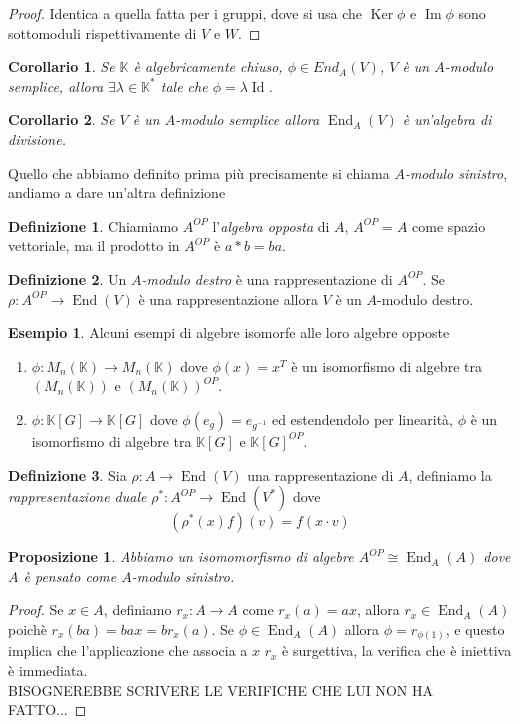 \documentclass[11pt]{article}
\theoremstyle{plain}
\newtheorem{prop}[thm]{Proposizione}
\newtheorem*{cor}{Corollario}
\theoremstyle{definition}
\newtheorem{defn}{Definizione}[section]
\newtheorem{exmp}{Esempio}[section]
\theoremstyle{remark}
\newcommand{\K}{\mathbb{K}}
\DeclareMathOperator{\End}{End}
\DeclareMathOperator{\Ker}{Ker}
\DeclareMathOperator{\Imm}{Im}
\DeclareMathOperator{\Id}{Id}
\begin{document}
	\begin{proof}
		Identica a quella fatta per i gruppi, dove si usa che $\Ker \phi$ e $\Imm \phi$ sono sottomoduli rispettivamente di $V$ e $W$.
	\end{proof}
	\begin{cor}
		Se $\K$ è algebricamente chiuso, $\phi\in End_A(V)$, $V$ è un $A$-modulo semplice, allora $\exists \lambda \in \K^*$ tale che $\phi = \lambda \Id$.
	\end{cor}
	\begin{cor}
		Se $V$ è un $A$-modulo semplice allora $\End_A(V)$ è un'algebra di divisione.
	\end{cor}
	Quello che abbiamo definito prima più precisamente si chiama \textit{$A$-modulo sinistro}, andiamo a dare un'altra definizione
	\begin{defn}
		Chiamiamo $A^{OP}$ l'\textit{algebra opposta} di $A$, $A^{OP}=A$ come spazio vettoriale, ma il prodotto in $A^{OP}$ è $a*b = ba$.
	\end{defn}
	\begin{defn}
		Un \textit{$A$-modulo destro} è una rappresentazione di $A^{OP}$. Se $\rho:A^{OP}\to \End(V)$ è una rappresentazione allora $V$ è un $A$-modulo destro.
	\end{defn}
	\begin{exmp}
		Alcuni esempi di algebre isomorfe alle loro algebre opposte
		\begin{enumerate}
			\item $\phi:M_n(\K) \to M_n(\K)$ dove $\phi(x)= x^T$ è un isomorfismo di algebre tra $\left(M_n(\K) \right)$ e $\left( M_n(\K) \right)^{OP}$.
			\item $\phi:\K[G]\to \K[G]$ dove $\phi(e_g)=e_{g^{-1}}$ ed estendendolo per linearità, $\phi$ è un isomorfismo di algebre tra $\K[G]$ e $\K[G]^{OP}$.
		\end{enumerate}
	\end{exmp}
	\begin{defn} Sia $\rho:A\to \End(V)$ una rappresentazione di $A$, definiamo la \textit{rappresentazione duale} $\rho^*:A^{OP}\to \End(V^*)$ dove
	\[
		(\rho^*(x)f)(v) = f(x\cdot v)
	\]
	\end{defn}
	\begin{prop}
		Abbiamo un isomomorfismo di algebre $A^{OP}\cong \End_A(A)$ dove $A$ è pensato come $A$-modulo sinistro.
	\end{prop}
	\begin{proof}
		Se $x\in A$, definiamo $r_x:A\to A$ come $r_x(a)=ax$, allora $r_x\in \End_A(A)$ poichè $r_x(ba)=bax = br_x(a)$. Se $\phi\in \End_A(A)$ allora $\phi = r_{\phi(1)}$, e questo implica che l'applicazione che associa a $x$ $r_x$ è surgettiva, la verifica che è iniettiva è immediata.\\
		BISOGNEREBBE SCRIVERE LE VERIFICHE CHE LUI NON HA FATTO...
	\end{proof}
\end{document}
